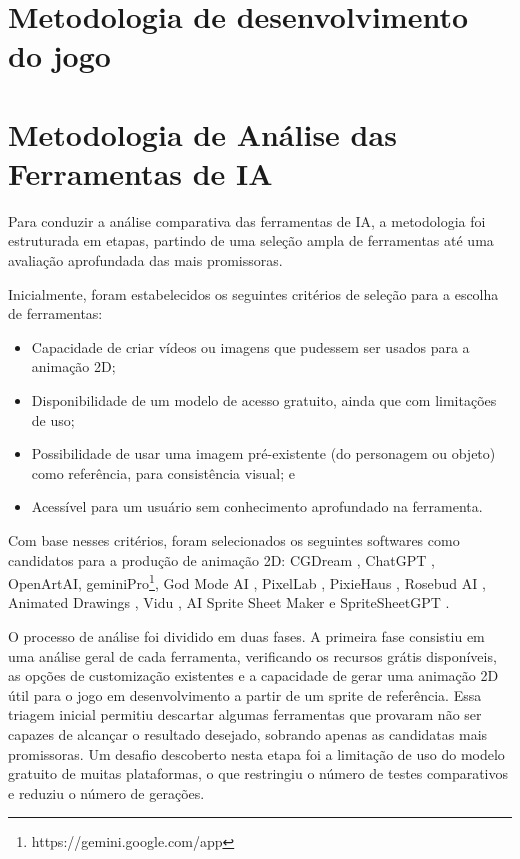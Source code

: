 \FloatBarrier
\section{Metodologia de desenvolvimento do jogo}
\label{s.jogo}

\FloatBarrier
\section{Metodologia de Análise das Ferramentas de IA}
\label{s.ia}


Para conduzir a análise comparativa das ferramentas de IA, a metodologia foi estruturada em etapas, partindo de uma seleção ampla de ferramentas até uma avaliação aprofundada das mais promissoras.

Inicialmente, foram estabelecidos os seguintes critérios de seleção para a escolha de ferramentas:

\begin{itemize}
\item Capacidade de criar vídeos ou imagens que pudessem ser usados para a animação 2D;
\item Disponibilidade de um modelo de acesso gratuito, ainda que com limitações de uso;
\item Possibilidade de usar uma imagem pré-existente (do personagem ou objeto) como referência, para consistência visual; e
\item Acessível para um usuário sem conhecimento aprofundado na ferramenta.
\end{itemize}

Com base nesses critérios, foram selecionados os seguintes softwares como candidatos para a produção de animação 2D: CGDream \cite{cgdream_2025}, ChatGPT \cite{chatgpt_2025}, OpenArtAI\cite{openArtai_2025}, geminiPro\footnote{https://gemini.google.com/app}, God Mode AI \cite{godmodeanimation2024}, PixelLab \cite{pixelLab}, PixieHaus \cite{pixie.haus_2025}, Rosebud AI \cite{rosebud}, Animated Drawings \cite{animatedDrawings}, Vidu \cite{viduai_2024}, AI Sprite Sheet Maker \cite{segmind} e SpriteSheetGPT \cite{spritesheetgpt-free}. 


O processo de análise foi dividido em duas fases. A primeira fase consistiu em uma análise geral de cada ferramenta, verificando os recursos grátis disponíveis, as opções de customização existentes e a capacidade de gerar uma animação 2D útil para o jogo em desenvolvimento a partir de um sprite de referência. Essa triagem inicial permitiu descartar algumas ferramentas que provaram não ser capazes de alcançar o resultado desejado, sobrando apenas as candidatas mais promissoras. Um desafio descoberto nesta etapa foi a limitação de uso do modelo gratuito de muitas plataformas, o que restringiu o número de testes comparativos e reduziu o número de gerações.

